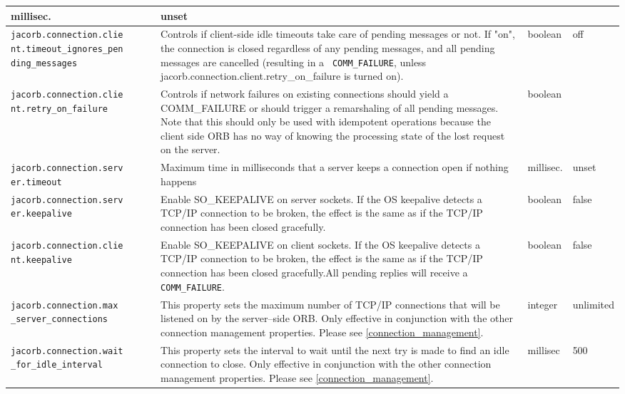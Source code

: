 {{\begin{small}
\begin{longtable}{|p{5cm}|p{7.5cm}|p{1.5cm}|p{1.5cm}|}
millisec. & unset \\
\hline
\verb"jacorb.connection.clie"
\verb"nt.timeout_ignores_pen"
\verb"ding_messages" & Controls if client-side idle timeouts take care of
pending messages or not. If "on", the connection is closed regardless of any
pending messages, and all pending messages are cancelled (resulting in a {\tt
COMM\_FAILURE}, unless jacorb.connection.client.retry\_on\_failure is turned
on).& boolean & off \\
\hline
\verb"jacorb.connection.clie"
\verb"nt.retry_on_failure" & Controls if network failures on existing connections
should yield a COMM\_FAILURE or should trigger a remarshaling
of all pending messages. Note that this should only be used with idempotent
operations because the client side ORB has no way of knowing the processing
state of the lost request on the server. & boolean & \\
\hline
\verb"jacorb.connection.serv"
\verb"er.timeout" & Maximum time in milliseconds that a server keeps a
connection open if nothing happens & millisec. & unset \\
\hline
\verb"jacorb.connection.serv"
\verb"er.keepalive" & Enable SO\_KEEPALIVE on server sockets. If the OS
keepalive detects a TCP/IP connection to be broken, the effect is the same as
if the TCP/IP connection has been closed gracefully. & boolean & false \\

\hline
\verb"jacorb.connection.clie"
\verb"nt.keepalive" & Enable SO\_KEEPALIVE on client sockets. If the OS
keepalive detects a TCP/IP connection to be broken, the effect is the same as
if the TCP/IP connection has been closed gracefully.All pending replies will
receive a {\tt COMM\_FAILURE}. & boolean & false \\
\hline
\verb"jacorb.connection.max"
\verb"_server_connections" & This property sets the
  maximum number of TCP/IP connections that will be listened on by the
  server--side ORB. Only effective in conjunction with the other connection
  management properties. Please see \ref{connection_management}.& integer &
  unlimited \\

\hline
\verb"jacorb.connection.wait"
\verb"_for_idle_interval" & This property sets the
  interval to wait until the next try is made to find an idle connection to
  close. Only effective in conjunction with the other connection management
  properties. Please see \ref{connection_management}. & millisec & 500\\


\end{longtable}
\end{small}}}
